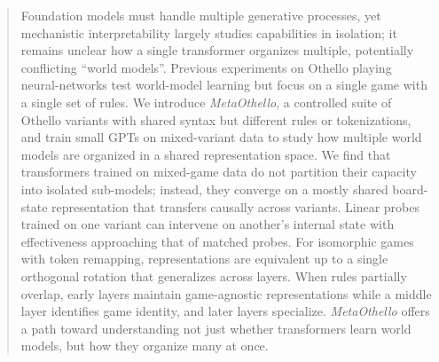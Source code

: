 \documentclass{article}
\theoremstyle{plain}
\theoremstyle{definition}
\theoremstyle{remark}
\begin{document}

\printAffiliationsAndNotice{\icmlEqualContribution}

\begin{abstract}
Foundation models must handle multiple generative processes, yet mechanistic interpretability largely studies capabilities in isolation; it remains unclear how a single transformer organizes multiple, potentially conflicting ``world models''. Previous experiments on Othello playing neural-networks test world-model learning but focus on a single game with a single set of rules. We introduce \textit{MetaOthello}, a controlled suite of Othello variants with shared syntax but different rules or tokenizations, and train small GPTs on mixed-variant data to study how multiple world models are organized in a shared representation space. We find that transformers trained on mixed-game data do not partition their capacity into isolated sub-models; instead, they converge on a mostly shared board-state representation that transfers causally across variants. Linear probes trained on one variant can intervene on another's internal state with effectiveness approaching that of matched probes. For isomorphic games with token remapping, representations are equivalent up to a single orthogonal rotation that generalizes across layers. When rules partially overlap, early layers maintain game-agnostic representations while a middle layer identifies game identity, and later layers specialize. \textit{MetaOthello} offers a path toward understanding not just whether transformers learn world models, but how they organize many at once.

\end{abstract}
\end{document}
